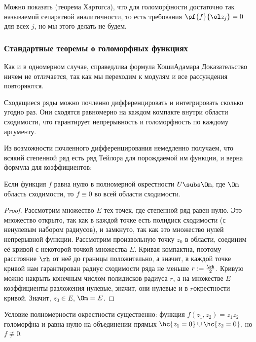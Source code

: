 \documentclass[a4paper]{article}
\begin{document}
\begin{note}
Можно показать (теорема Хартогса), что для голоморфности достаточно так называемой сепаратной
аналитичности, то есть требования $\pf{f}{\ol z_j}=0$ для всех $j$, но мы этого делать не будем.
\end{note}

\subsubsection{Стандартные теоремы о голоморфных функциях}

Как и в одномерном случае, справедлива формула Коши\ч Адамара
Доказательство ничем не отличается, так как мы переходим к модулям и все рассуждения повторяются.

Сходящиеся ряды можно почленно дифференцировать и интегрировать сколько угодно раз. Они сходятся
равномерно на каждом компакте внутри области сходимости, что гарантирует непрерывность и голоморфность по
каждому аргументу.

Из возможности почленного дифференцирования немедленно получаем, что всякий степенной ряд есть ряд Тейлора
для порождаемой им функции, и верна формула для коэффициентов:

\begin{theorem}[единственности]
Если функция $f$ равна нулю в полномерной окрестности $U\subs \Om$, где $\Om$\т область сходимости,
то $f\equiv0$ во всей области сходимости.
\end{theorem}
\begin{proof}
Рассмотрим множество $E$ тех точек, где степенной ряд равен нулю. Это множество открыто,
так как в каждой точке есть полидиск сходимости (с ненулевым набором радиусов), и замкнуто,
так как это множество нулей непрерывной функции. Рассмотрим произвольную точку $z_0$ в области, соединим её
кривой с некоторой точкой множества $E$. Кривая компактна, поэтому расстояние $\rh$ от неё до границы положительно,
а значит, в каждой точке кривой нам гарантирован радиус сходимости ряда не меньше $r := \frac\rh2$. Кривую
можно накрыть конечным числом полидисков радиуса $r$, а на множестве $E$ коэффициенты разложения нулевые, значит, они нулевые
и в $r$\д окрестности кривой. Значит, $z_0\in E$,  $\Om=E$.
\end{proof}

\begin{note}
Условие полномерности окрестности существенно: функция $f(z_1,z_2)=z_1z_2$ голоморфна и равна
нулю на объединении прямых $\hc{z_1=0}\cup \hc{z_2=0}$, но $f\not\equiv0$.
\end{note}
\end{document}
